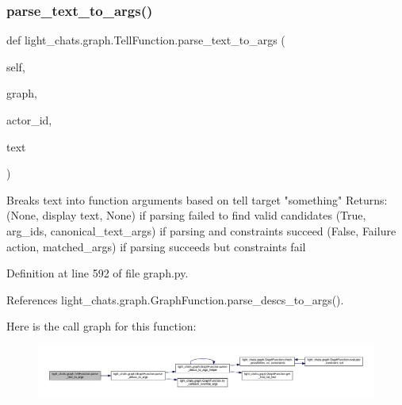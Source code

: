 \mbox{\label{classlight__chats_1_1graph_1_1TellFunction_a88ac4115a6cca664cd220fb0b8852629}} 
\subsubsection{\texorpdfstring{parse\+\_\+text\+\_\+to\+\_\+args()}{parse\_text\_to\_args()}}
{\footnotesize\ttfamily def light\+\_\+chats.\+graph.\+Tell\+Function.\+parse\+\_\+text\+\_\+to\+\_\+args (\begin{DoxyParamCaption}\item[{}]{self,  }\item[{}]{graph,  }\item[{}]{actor\+\_\+id,  }\item[{}]{text }\end{DoxyParamCaption})}

\begin{DoxyVerb}Breaks text into function arguments based on tell target "something"
Returns:
(None, display text, None) if parsing failed to find valid candidates
(True, arg_ids, canonical_text_args) if parsing and constraints succeed
(False, Failure action, matched_args)
if parsing succeeds but constraints fail
\end{DoxyVerb}
 

Definition at line 592 of file graph.\+py.



References light\+\_\+chats.\+graph.\+Graph\+Function.\+parse\+\_\+descs\+\_\+to\+\_\+args().

Here is the call graph for this function\+:
\nopagebreak
\begin{figure}[H]
\begin{center}
\leavevmode
\includegraphics[width=350pt]{classlight__chats_1_1graph_1_1TellFunction_a88ac4115a6cca664cd220fb0b8852629_cgraph}
\end{center}
\end{figure}
\mbox{\label{classlight__chats_1_1graph_1_1TellFunction_a86e8534217b3d10cb4daf5cc080d624e}} 
